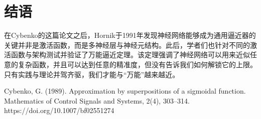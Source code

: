 \documentclass[12pt]{article}
\begin{document}
\section{结语}
在Cybenko的这篇论文之后，Hornik于1991年发现神经网络能够成为通用逼近器的关键并非是激活函数，而是多神经层与神经元结构。此后，学者们也针对不同的激活函数与架构测试并验证了万能逼近定理。该定理强调了神经网络可以用来近似任意的复杂函数，并且可以达到任意的精准度，但没有告诉我们如何解锁它的上限。只有实践与理论并驾齐驱，我们才能与“万能”越来越近。

\begin{thebibliography}{99}
     Cybenko, G. (1989). Approximation by superpositions of a sigmoidal function. Mathematics of Control Signals and Systems, 2(4), 303–314. https://doi.org/10.1007/bf02551274
\end{thebibliography}
\end{document}
